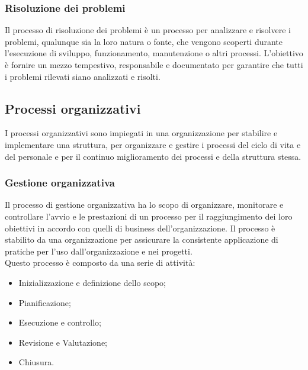 \subsubsection{Risoluzione dei problemi}
Il processo di risoluzione dei problemi è un processo per analizzare e risolvere i problemi, qualunque sia la loro natura o fonte, che vengono scoperti durante l'esecuzione di sviluppo, funzionamento, manutenzione o altri processi. L'obiettivo è fornire un mezzo tempestivo, responsabile e documentato per garantire che tutti i problemi rilevati siano analizzati e risolti.

\subsection{Processi organizzativi}
I processi organizzativi sono impiegati in  una organizzazione per stabilire e implementare una struttura, per organizzare e gestire i processi del ciclo di vita e del personale e per il continuo miglioramento dei processi e della struttura stessa.

\subsubsection{Gestione organizzativa}
Il processo di gestione organizzativa ha lo scopo di organizzare, monitorare e controllare l'avvio e le prestazioni di un processo per il raggiungimento dei loro obiettivi in accordo con quelli di business dell'organizzazione. Il processo è stabilito da una organizzazione per assicurare la consistente applicazione di pratiche per l'uso dall'organizzazione e nei progetti.\\
Questo processo è composto da una serie di attività:
\begin{itemize}
	\item Inizializzazione e definizione dello scopo;
	
	\item Pianificazione;
	
	\item Esecuzione e controllo;
	
	\item Revisione e Valutazione;
	
	\item Chiusura.
\end{itemize}

